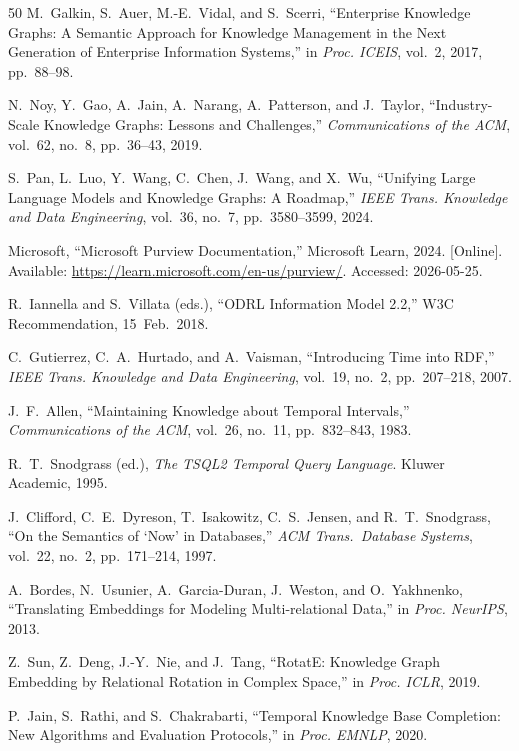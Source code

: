\documentclass{ieeeaccess}
\begin{document}
\begin{thebibliography}{50}
M.~Galkin, S.~Auer, M.-E.~Vidal, and S.~Scerri, ``Enterprise Knowledge Graphs: A Semantic Approach for Knowledge Management in the Next Generation of Enterprise Information Systems,'' in \textit{Proc. ICEIS}, vol.~2, 2017, pp.~88--98.

N.~Noy, Y.~Gao, A.~Jain, A.~Narang, A.~Patterson, and J.~Taylor, ``Industry-Scale Knowledge Graphs: Lessons and Challenges,'' \textit{Communications of the ACM}, vol.~62, no.~8, pp.~36--43, 2019.

S.~Pan, L.~Luo, Y.~Wang, C.~Chen, J.~Wang, and X.~Wu, ``Unifying Large Language Models and Knowledge Graphs: A Roadmap,'' \textit{IEEE Trans. Knowledge and Data Engineering}, vol.~36, no.~7, pp.~3580--3599, 2024.

Microsoft, ``Microsoft Purview Documentation,'' Microsoft Learn, 2024. [Online]. Available: \url{https://learn.microsoft.com/en-us/purview/}. Accessed: 2026-05-25.

R.~Iannella and S.~Villata (eds.), ``ODRL Information Model 2.2,'' W3C Recommendation, 15~Feb.~2018.

C.~Gutierrez, C.~A.~Hurtado, and A.~Vaisman, ``Introducing Time into RDF,'' \textit{IEEE Trans. Knowledge and Data Engineering}, vol.~19, no.~2, pp.~207--218, 2007.

J.~F.~Allen, ``Maintaining Knowledge about Temporal Intervals,'' \textit{Communications of the ACM}, vol.~26, no.~11, pp.~832--843, 1983.

R.~T.~Snodgrass (ed.), \textit{The TSQL2 Temporal Query Language}. Kluwer Academic, 1995.

J.~Clifford, C.~E.~Dyreson, T.~Isakowitz, C.~S.~Jensen, and R.~T.~Snodgrass, ``On the Semantics of `Now' in Databases,'' \textit{ACM Trans.\ Database Systems}, vol.~22, no.~2, pp.~171--214, 1997.

A.~Bordes, N.~Usunier, A.~Garcia-Duran, J.~Weston, and O.~Yakhnenko, ``Translating Embeddings for Modeling Multi-relational Data,'' in \textit{Proc. NeurIPS}, 2013.

Z.~Sun, Z.~Deng, J.-Y.~Nie, and J.~Tang, ``RotatE: Knowledge Graph Embedding by Relational Rotation in Complex Space,'' in \textit{Proc. ICLR}, 2019.

P.~Jain, S.~Rathi, and S.~Chakrabarti, ``Temporal Knowledge Base Completion: New Algorithms and Evaluation Protocols,'' in \textit{Proc. EMNLP}, 2020.


\end{thebibliography}
\end{document}
